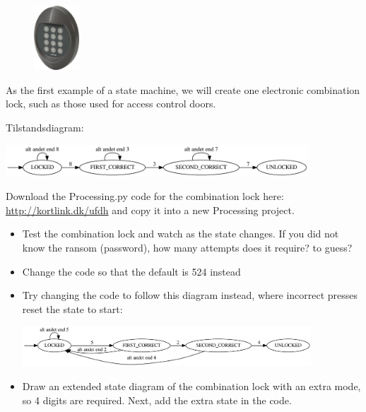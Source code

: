 \newpage
{}
\begin{exercisebox}[adjusted title= Finite state machines]

\begin{minipage}{1.0\linewidth}
\begin{figure}
   \vspace{-1em}
   \includegraphics[width=0.15\textwidth]{illustrationer/unitek_kombinationslaas.jpg}
\end{figure}
 
As the first example of a state machine, we will create one
electronic combination lock, such as those used for access control
doors.

\noindent
Tilstandsdiagram:

\noindent
\includegraphics[width=0.85\textwidth]{graphviz/combinationLock_dumb}

Download the Processing.py code for the combination lock here:
\mbox{\url{http://kortlink.dk/ufdh}} and copy it into a new Processing project.

\end{minipage}

\begin{itemize}
\item Test the combination lock and watch as the state changes. If you
did not know the ransom (password), how many attempts does it require?
to guess?

\item Change the code so that the default is 524 instead
\item Try changing the code to follow this diagram instead, where incorrect presses reset the state to start:
 
\includegraphics[width=0.85\textwidth]{graphviz/combinationLock_resetting}

\item Draw an extended state diagram of the combination lock with an extra mode, so 4 digits are required. Next, add the extra state in the code.
\end{itemize}
\end{exercisebox}

